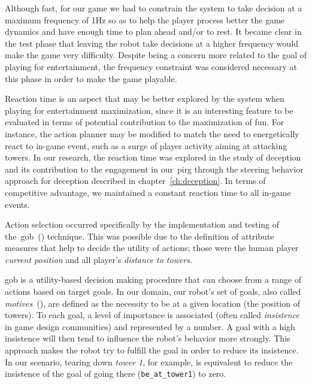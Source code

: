 Although fast, for our game we had to constrain the system to take decision at a maximum frequency of 1Hz so as to help the player process better the game dynamics and have enough time to plan ahead and/or to rest. It became clear in the test phase that leaving the robot take decisions at a higher frequency would make the game very difficulty. Despite being a concern more related to the goal of playing for entertainment, the frequency constraint was considered necessary at this phase in order to make the game playable. 



Reaction time is an aspect that may be better explored by the system when playing for entertainment maximization, since it is an interesting feature to be evaluated in terms of potential contribution to the maximization of fun. For instance, the action planner may be modified to match the need to energetically react to in-game event, such as a surge of player activity aiming at attacking towers. In our research, the reaction time was explored in the study of deception and its contribution to the engagement in our~\gls{pirg} through the steering behavior approach for deception described in chapter~\ref{ch:deception}. In terms of competitive advantage, we maintained a constant reaction time to all in-game events.

Action selection occurred specifically by the implementation and testing of the~\gls{gob}~(\cite{millington_artificial_2009}) technique. This was possible due to the definition of attribute measures that help to decide the utility of actions; those were the human player \textit{current position} and all player's \textit{distance to towers}.

\glsdesc{gob} is a utility-based decision making procedure that can choose from a range of actions based on target goals. In our domain, our robot's set of goals, also called \textit{motives}~(\cite{millington_artificial_2009}), are defined as the necessity to be at a given location (the position of towers). To each goal, a level of importance is associated (often called \textit{insistence} in game design communities) and represented by a number. A goal with a high insistence will then tend to influence the robot's behavior more strongly. This approach makes the robot try to fulfill the goal in order to reduce its insistence. In our scenario, tearing down \textit{tower 1}, for example, is equivalent to reduce the insistence of the goal of going there (\verb|be_at_tower1|) to zero. 


